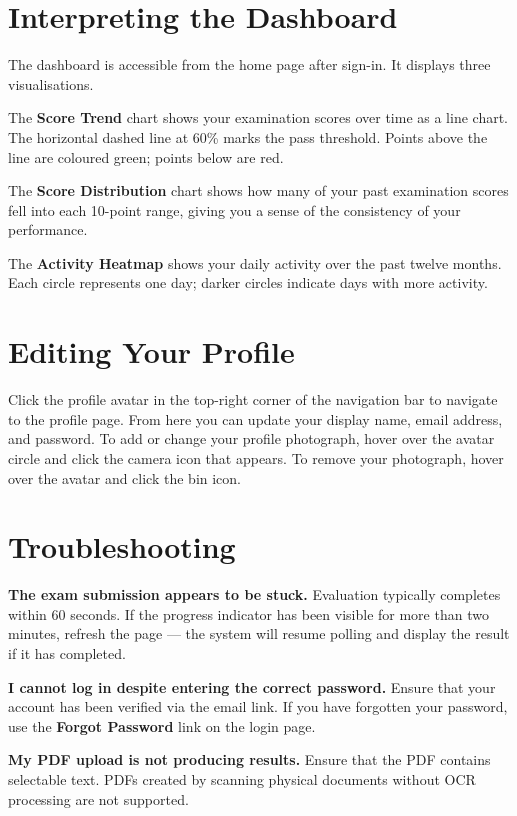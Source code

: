 \documentclass[12pt, a4paper]{report}
\begin{document}
\section{Interpreting the Dashboard}

The dashboard is accessible from the home page after sign-in. It displays three visualisations.

The \textbf{Score Trend} chart shows your examination scores over time as a line chart. The horizontal dashed line at 60\% marks the pass threshold. Points above the line are coloured green; points below are red.

The \textbf{Score Distribution} chart shows how many of your past examination scores fell into each 10-point range, giving you a sense of the consistency of your performance.

The \textbf{Activity Heatmap} shows your daily activity over the past twelve months. Each circle represents one day; darker circles indicate days with more activity.

\section{Editing Your Profile}

Click the profile avatar in the top-right corner of the navigation bar to navigate to the profile page. From here you can update your display name, email address, and password. To add or change your profile photograph, hover over the avatar circle and click the camera icon that appears. To remove your photograph, hover over the avatar and click the bin icon.

\section{Troubleshooting}

\textbf{The exam submission appears to be stuck.} Evaluation typically completes within 60 seconds. If the progress indicator has been visible for more than two minutes, refresh the page — the system will resume polling and display the result if it has completed.

\textbf{I cannot log in despite entering the correct password.} Ensure that your account has been verified via the email link. If you have forgotten your password, use the \textbf{Forgot Password} link on the login page.

\textbf{My PDF upload is not producing results.} Ensure that the PDF contains selectable text. PDFs created by scanning physical documents without OCR processing are not supported.
\end{document}
